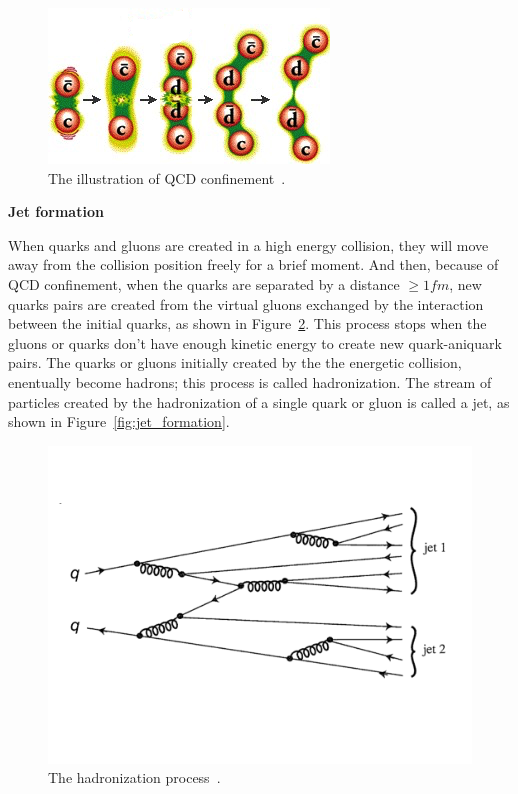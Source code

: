 \begin{figure}[htb]
\centering
\includegraphics[width=.7\textwidth]{figures/color_field.jpg}
\caption{The illustration of QCD confinement~\cite{web:qcd_confinement}.}
\label{fig:color_field}
\end{figure}  



{\bf Jet formation}

When quarks and gluons are created in a high energy collision, they will
move away from the collision position freely for a brief moment. And then,
because of QCD confinement, when the quarks are separated by a distance
${\geq} 1fm$, new quarks pairs are created from the virtual gluons exchanged by 
the interaction between the initial quarks, as shown in Figure~\ref{fig:hadronization}. 
This process stops when the gluons or quarks don't have enough kinetic energy to create new
quark-aniquark pairs. The quarks or gluons initially created by the the energetic collision,
enentually become hadrons; this process is called hadronization. The stream of particles
created by the hadronization of a single quark or gluon is called a jet, as shown in Figure~\ref{fig:jet_formation}. 


\begin{figure}[!htbp]
\centering
\includegraphics[width=.7\textwidth]{figures/jets.png}
\caption{The hadronization process~\cite{particlebook1}.}
\label{fig:hadronization}
\end{figure}  


